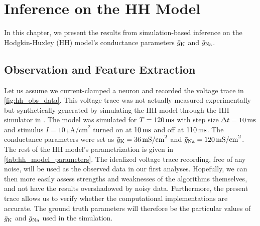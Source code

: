 \chapter{Inference on the HH Model}\label{chap:res_hh}

In this chapter, we present the results from simulation-based inference on the Hodgkin-Huxley (HH) model's conductance parameters $\bar{g}_{\mathrm{K}}$ and $\bar{g}_{\mathrm{Na}}$. 







\section{Observation and Feature Extraction}

Let us assume we current-clamped a neuron and recorded the voltage trace in \autoref{fig:hh_obs_data}. This voltage trace was not actually measured experimentally but synthetically generated by simulating the HH model through the HH simulator in . The model was simulated for $T=120\,\mathrm{ms}$ with step size $\Delta t =10 \,\mathrm{ms}$ and stimulus $I = 10 \, \mathrm{\mu A/cm}^2$ turned on at $10 \,\mathrm{ms}$ and off at $110 \,\mathrm{ms}$. The conductance parameters were set as $\bar{g}_{\mathrm{K}}=36 \,\mathrm{mS/cm}^2$ and $\bar{g}_{\mathrm{Na}}=120 \,\mathrm{mS/cm}^2$. The rest of the HH model's parametrization is given in \autoref{tab:hh_model_parameters}. The idealized voltage trace recording, free of any noise, will be used as the observed data in our first analyses. Hopefully, we can then more easily assess strengths and weaknesses of the algorithms themselves, and not have the results overshadowed by noisy data. Furthermore, the present trace allows us to verify whether the computational implementations are accurate. The ground truth parameters will therefore be the particular values of $\bar{g}_{\mathrm{K}}$ and $\bar{g}_{\mathrm{Na}}$ used in the simulation.  

